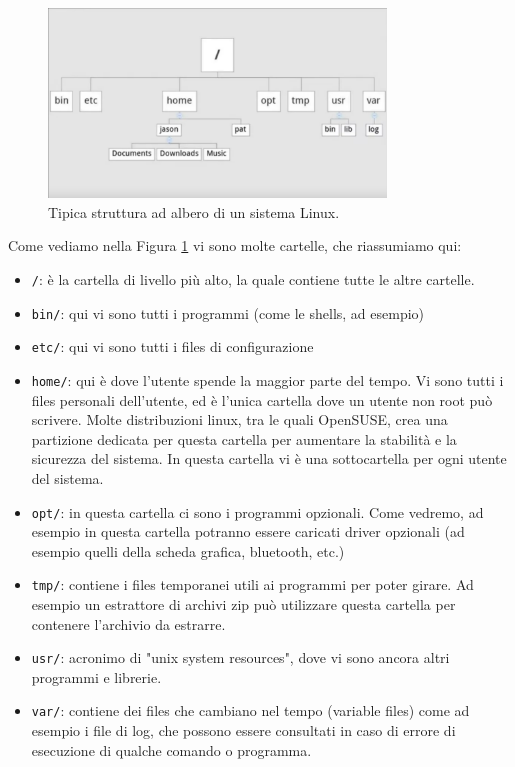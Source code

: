 \begin{figure}
	\centering
	\includegraphics[width=0.8\textwidth]{img/filesystem_tree.png}
	\caption{Tipica struttura ad albero di un sistema Linux.}
	\label{fs_tree}
\end{figure}

Come vediamo nella Figura \ref{fs_tree} vi sono molte cartelle, che riassumiamo qui:
\begin{itemize}
	\item \verb"/": è la cartella di livello più alto, la quale contiene tutte le altre cartelle.
	\item \verb"bin/": qui vi sono tutti i programmi (come le shells, ad esempio)
	\item \verb"etc/": qui vi sono tutti i files di configurazione 
	\item \verb"home/": qui è dove l'utente spende la maggior parte del tempo. Vi sono tutti i files personali dell'utente, ed è l'unica cartella dove un utente non root può scrivere. Molte distribuzioni linux, tra le quali OpenSUSE, crea una partizione dedicata per questa cartella per aumentare la stabilità e la sicurezza del sistema. In questa cartella vi è una sottocartella per ogni utente del sistema.
	\item \verb"opt/": in questa cartella ci sono i programmi opzionali. Come vedremo, ad esempio in questa cartella potranno essere caricati driver opzionali (ad esempio quelli della scheda grafica, bluetooth, etc.) 
	\item \verb"tmp/": contiene i files temporanei utili ai programmi per poter girare. Ad esempio un estrattore di archivi zip può utilizzare questa cartella per contenere l'archivio da estrarre. 
	\item \verb"usr/": acronimo di "unix system resources", dove vi sono ancora altri programmi e librerie.
	\item \verb"var/": contiene dei files che cambiano nel tempo (variable files) come ad esempio i file di log, che possono essere consultati in caso di errore di esecuzione di qualche comando o programma.
\end{itemize}

